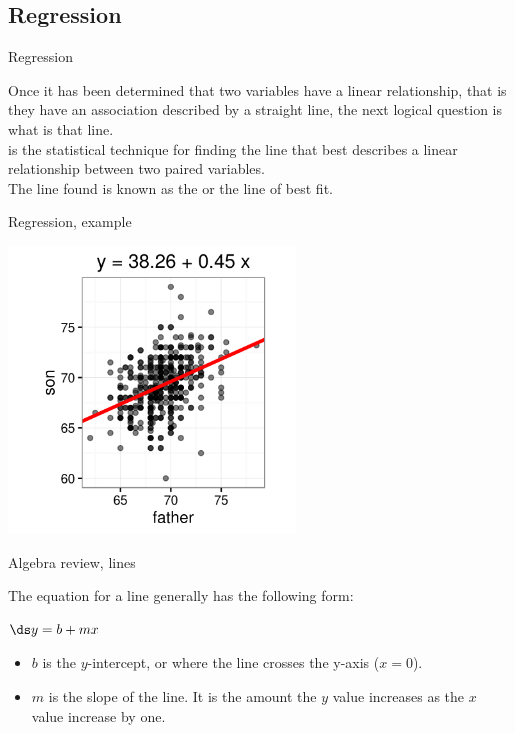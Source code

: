 \documentclass[xcolor=table]{beamer}
\begin{document}
\subsection{Regression}

\begin{frame}{Regression}
\begin{block}{}
\large
Once it has been determined that two variables have a linear relationship, that is they have an association described by a straight line, the next logical question is what is that line.\\
\pause\medskip
{} is the statistical technique for finding the line that best describes a linear relationship between two paired variables.\\
\pause\medskip
The line found is known as the  or the line of best fit.
\end{block}
\end{frame}

\begin{frame}{Regression, example}

\medskip
{\centering
\includegraphics[width=3in]{../images/ch10_reg_galton}
\par}

\end{frame}

\begin{frame}{Algebra review, lines}
\begin{block}{}
The equation for a line generally has the following form:\\
\smallskip
{\centering \Large
$\ds y = b + mx$
\par}
\begin{itemize}
\item $b$ is the $y$-intercept, or where the line crosses the y-axis ($x=0$).
\item $m$ is the slope of the line. It is the amount the $y$ value increases as the $x$ value increase by one.
\end{itemize}
\end{block}
\end{frame}
\end{document}
